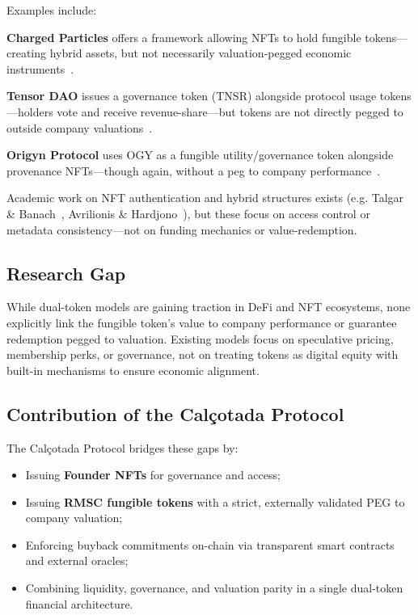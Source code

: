 \documentclass[conference]{IEEEtran}
\begin{document}
Examples include:

\textbf{Charged Particles} offers a framework allowing NFTs to hold fungible tokens—creating hybrid assets, but not necessarily valuation‑pegged economic instruments~\cite{chargedparticles2022}.

\textbf{Tensor DAO} issues a governance token (TNSR) alongside protocol usage tokens—holders vote and receive revenue-share—but tokens are not directly pegged to outside company valuations~\cite{tensor2025}.

\textbf{Origyn Protocol} uses OGY as a fungible utility/governance token alongside provenance NFTs—though again, without a peg to company performance~\cite{origyn2022}.

Academic work on NFT authentication and hybrid structures exists (e.g. Talgar \& Banach~\cite{talgar2024dao}, Avrilionis \& Hardjono~\cite{avrilionis2022assetproxy}), but these focus on access control or metadata consistency—not on funding mechanics or value-redemption.

\subsection{Research Gap}

While dual-token models are gaining traction in DeFi and NFT ecosystems, none explicitly link the fungible token’s value to company performance or guarantee redemption pegged to valuation. Existing models focus on speculative pricing, membership perks, or governance, not on treating tokens as digital equity with built-in mechanisms to ensure economic alignment.

\subsection{Contribution of the Calçotada Protocol}

The Calçotada Protocol bridges these gaps by:

\begin{itemize}
    \item Issuing \textbf{Founder NFTs} for governance and access;
    \item Issuing \textbf{RMSC fungible tokens} with a strict, externally validated PEG to company valuation;
    \item Enforcing buyback commitments on-chain via transparent smart contracts and external oracles;
    \item Combining liquidity, governance, and valuation parity in a single dual-token financial architecture.
\end{itemize}
\end{document}
